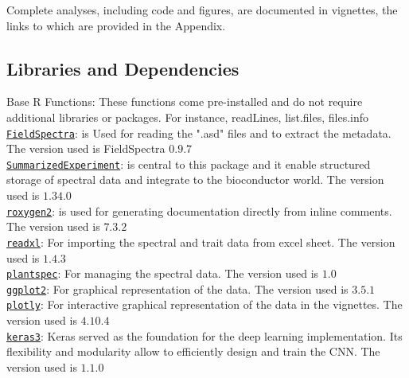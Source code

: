 \documentclass[12pt,a4paper]{report}
\begin{document}
Complete analyses, including code and figures, are documented in vignettes, the links to which are provided in the Appendix.

\subsection*{Libraries and Dependencies}

Base R Functions: These functions come pre-installed and do not require additional libraries or packages. For instance, readLines, list.files, files.info \\

\texttt{\href{https://github.com/serbinsh/R-FieldSpectra}{FieldSpectra}}: is Used for reading the ".asd" files and to extract the metadata. The version used is FieldSpectra $0.9.7$\\

\texttt{\href{https://github.com/Bioconductor/SummarizedExperiment}{SummarizedExperiment}}: is central to this package and it enable structured storage of spectral data and integrate to the bioconductor world. The version used is $1.34.0$ \\

\texttt{\href{https://github.com/r-lib/roxygen2}{roxygen2}}: is used for generating documentation directly from inline comments. The version used is $7.3.2$ \\

\texttt{\href{https://cran.r-project.org/web/packages/readxl/index.html}{readxl}}: For importing the spectral and trait data from excel sheet. The version used is $1.4.3$ \\

\texttt{\href{https://github.com/griffithdan/plantspec}{plantspec}}: For managing the spectral data. The version used is $1.0$ \\

\texttt{\href{https://ggplot2.tidyverse.org}{ggplot2}}: For graphical representation of the data. The version used is $3.5.1$ \\

\texttt{\href{https://github.com/plotly/plotly.py}{plotly}}: For interactive graphical representation of the data in the vignettes. The version used is $4.10.4$ \\


\texttt{\href{https://github.com/keras-team/keras}{keras3}}: Keras served as the foundation for the deep learning implementation. Its flexibility and modularity allow to efficiently design and train the CNN. The version used is $1.1.0$ \\
\end{document}
